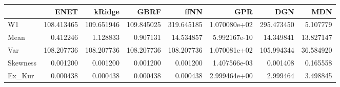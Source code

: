 \begin{tabular}{lrrrrrrr}
\toprule
{} &        ENET &      kRidge &        GBRF &        ffNN &           GPR &         DGN &        MDN \\
\midrule
W1       &  108.413465 &  109.651946 &  109.845025 &  319.645185 &  1.070080e+02 &  295.473450 &   5.107779 \\
Mean     &    0.412246 &    1.128833 &    0.907131 &   14.534857 &  5.992167e-10 &   14.349841 &  13.827147 \\
Var      &  108.207736 &  108.207736 &  108.207736 &  108.207736 &  1.070081e+02 &  105.994344 &  36.584920 \\
Skewness &    0.001200 &    0.001200 &    0.001200 &    0.001200 &  1.407566e-03 &    0.001408 &   0.165558 \\
Ex\_Kur   &    0.000438 &    0.000438 &    0.000438 &    0.000438 &  2.999464e+00 &    2.999464 &   3.498845 \\
\bottomrule
\end{tabular}
